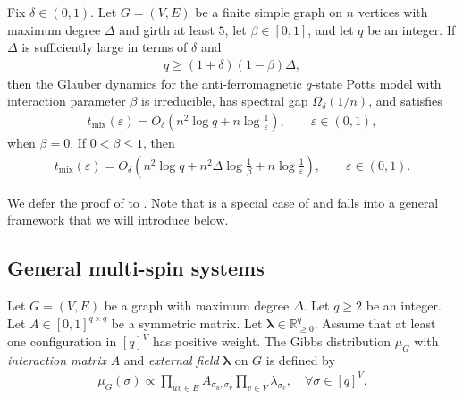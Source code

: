 \documentclass[a4paper,12pt]{article}
\theoremstyle{plain}
\theoremstyle{definition}
\def\*#1{\mathbf{#1}} %
\def\*#1{\boldsymbol{#1}} %
\begin{document}
\begin{theorem}%
\label{thm:Potts}
Fix $\delta\in(0,1)$.  Let $G=(V,E)$ be a finite simple graph on $n$
vertices with maximum degree $\Delta$ and girth at least $5$, let
$\beta\in[0,1]$, and let $q$ be an integer.  If $\Delta$ is
sufficiently large in terms of $\delta$ and
\begin{align*}
  q\geq(1+\delta)(1-\beta)\Delta,
\end{align*}
then the Glauber dynamics for the anti-ferromagnetic $q$-state Potts
model with interaction parameter $\beta$ is irreducible, has spectral
gap $\Omega_\delta(1/n)$, and satisfies
\begin{align} \label{eq:spectral-gap-mixing-bound}
  t_{\mathrm{mix}}(\varepsilon)
  =
  O_\delta\left(
    n^2\log q+n\log\frac1\varepsilon
  \right),
  \qquad
  \varepsilon\in(0,1),
\end{align}
when $\beta=0$.  If $0<\beta\leq1$, then
\begin{align*}
  t_{\mathrm{mix}}(\varepsilon)
  =
  O_\delta\left(
    n^2\log q+n^2\Delta\log\frac1\beta
    +n\log\frac1\varepsilon
  \right),
  \qquad
  \varepsilon\in(0,1).
\end{align*}
\end{theorem}

We defer the proof of  to .
Note that  is a special case of  and  falls into a general framework that we will introduce below.

\subsection{General multi-spin systems}
Let $G = (V,E)$ be a graph with maximum degree $\Delta$.
Let $q \geq 2$ be an integer.
Let $A \in [0,1]^{q\times q}$ be a symmetric matrix.
Let $\*\lambda \in \mathbb{R}_{\geq 0}^q$.
Assume that at least one configuration in $[q]^V$ has positive weight.
The Gibbs distribution $\mu_G$ with \emph{interaction matrix} $A$ and \emph{external field} $\*\lambda$ on $G$ is defined by
\begin{align*}
  \mu_G(\sigma) \propto \prod_{uv \in E} A_{\sigma_u,\sigma_v} \prod_{v\in V} \lambda_{\sigma_v}, \quad \forall \sigma \in [q]^V.
\end{align*}
\end{document}
